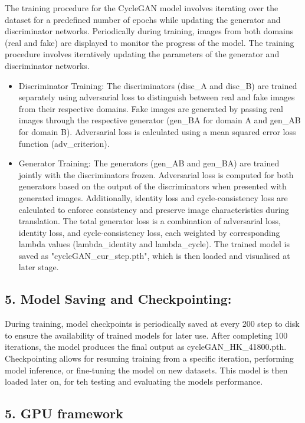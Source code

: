 \documentclass[UKenglish,12pt]{master-style}
\begin{document}
The training procedure for the CycleGAN model involves iterating over the dataset for a predefined number of epochs while updating the generator and discriminator networks. Periodically during training, images from both domains (real and fake) are displayed to monitor the progress of the model. The training procedure involves iteratively updating the parameters of the generator
and discriminator networks.
\begin{itemize}
\item Discriminator Training: The discriminators (disc\_A and disc\_B) are trained separately using adversarial loss to distinguish between real and fake images from their respective domains. Fake images are generated by passing real images through the respective generator (gen\_BA for domain A and gen\_AB for domain B). Adversarial loss is calculated using a mean squared error loss function (adv\_criterion).
\item Generator Training: The generators (gen\_AB and gen\_BA) are trained jointly with the discriminators frozen. Adversarial loss is computed for both generators based on the output of the discriminators when presented with generated images. Additionally, identity loss and cycle-consistency loss are calculated to enforce consistency and preserve image characteristics during translation. The total generator loss is a combination of adversarial loss, identity loss, and cycle-consistency loss, each weighted by corresponding lambda values (lambda\_identity and lambda\_cycle). The trained model is saved as "cycleGAN\_cur\_step.pth", which is then loaded and visualised at later stage.
\end{itemize}


\subsection*{5. Model Saving and Checkpointing:}

During training, model checkpoints is periodically saved at every 200 step to disk to ensure the availability of trained models for later use. After completing 100 iterations, the model produces the final output as cycleGAN\_HK\_41800.pth. Checkpointing allows for resuming training from a specific iteration, performing model inference, or fine-tuning the model on new datasets. This model is then loaded later on, for teh testing and evaluating the models performance.

\subsection*{5. GPU framework}
\end{document}
